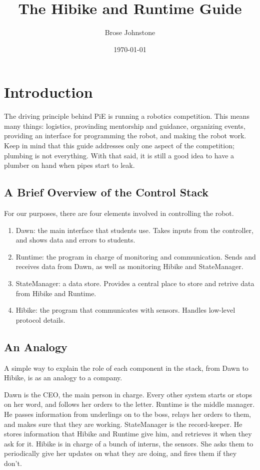 \documentclass[12pt]{book}
\title{The Hibike and Runtime Guide}
\date{\today}
\author{Brose Johnstone}
\begin{document}
\maketitle

\tableofcontents

\chapter{Introduction}
The driving principle behind PiE is running a robotics competition. This means many things:
logistics, provinding mentorship and guidance, organizing events,
providing an interface for programming the robot, and making
the robot work. Keep in mind that this guide addresses only one aspect
of the competition; plumbing is not everything. With that said, it is still a good
idea to have a plumber on hand when pipes start to leak.
\section{A Brief Overview of the Control Stack}
For our purposes, there are four elements involved in controlling the robot.
\begin{enumerate}
\item Dawn: the main interface that students use. Takes inputs from the controller,
and shows data and errors to students.
\item Runtime: the program in charge of monitoring and communication. Sends and receives data from
Dawn, as well as monitoring Hibike and StateManager.
\item StateManager: a data store. Provides a central place to store and retrive data from Hibike
and Runtime.
\item Hibike: the program that communicates with sensors. Handles low-level protocol details.
\end{enumerate}
\section{An Analogy}
A simple way to explain the role of each component in the stack, from Dawn to Hibike, is
as an analogy to a company.

Dawn is the CEO, the main person in charge. Every other system starts or stops
on her word, and follows her orders to the letter. Runtime is the middle manager. He
passes information from underlings on to the boss, relays her orders to them, and makes
sure that they are working. StateManager is the record-keeper. He stores information
that Hibike and Runtime give him, and retrieves it when they ask for it. Hibike is
in charge of a bunch of interns, the sensors. She asks them to periodically give her
updates on what they are doing, and fires them if they don't.
\end{document}
